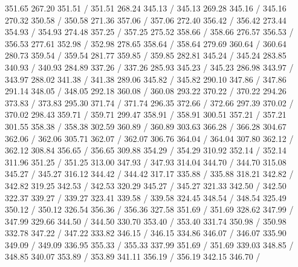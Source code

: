 { 351.65 267.20 351.51 /
 351.51 268.24 345.13 /
 345.13 269.28 345.16 /
 345.16 270.32 350.58 /
 350.58 271.36 357.06 /
 357.06 272.40 356.42 /
 356.42 273.44 354.93 /
 354.93 274.48 357.25 /
 357.25 275.52 358.66 /
 358.66 276.57 356.53 /
 356.53 277.61 352.98 /
 352.98 278.65 358.64 /
 358.64 279.69 360.64 /
 360.64 280.73 359.54 /
 359.54 281.77 359.85 /
 359.85 282.81 345.24 /
 345.24 283.85 340.93 /
 340.93 284.89 337.26 /
 337.26 285.93 345.23 /
 345.23 286.98 343.97 /
 343.97 288.02 341.38 /
 341.38 289.06 345.82 /
 345.82 290.10 347.86 /
 347.86 291.14 348.05 /
 348.05 292.18 360.08 /
 360.08 293.22 370.22 /
 370.22 294.26 373.83 /
 373.83 295.30 371.74 /
 371.74 296.35 372.66 /
 372.66 297.39 370.02 /
 370.02 298.43 359.71 /
 359.71 299.47 358.91 /
 358.91 300.51 357.21 /
 357.21 301.55 358.38 /
 358.38 302.59 360.89 /
 360.89 303.63 366.28 /
 366.28 304.67 362.06 /
 362.06 305.71 362.07 /
 362.07 306.76 364.04 /
 364.04 307.80 362.12 /
 362.12 308.84 356.65 /
 356.65 309.88 354.29 /
 354.29 310.92 352.14 /
 352.14 311.96 351.25 /
 351.25 313.00 347.93 /
 347.93 314.04 344.70 /
 344.70 315.08 345.27 /
 345.27 316.12 344.42 /
 344.42 317.17 335.88 /
 335.88 318.21 342.82 /
 342.82 319.25 342.53 /
 342.53 320.29 345.27 /
 345.27 321.33 342.50 /
 342.50 322.37 339.27 /
 339.27 323.41 339.58 /
 339.58 324.45 348.54 /
 348.54 325.49 350.12 /
 350.12 326.54 356.36 /
 356.36 327.58 351.69 /
 351.69 328.62 347.99 /
 347.99 329.66 344.50 /
 344.50 330.70 353.40 /
 353.40 331.74 350.98 /
 350.98 332.78 347.22 /
 347.22 333.82 346.15 /
 346.15 334.86 346.07 /
 346.07 335.90 349.09 /
 349.09 336.95 355.33 /
 355.33 337.99 351.69 /
 351.69 339.03 348.85 /
 348.85 340.07 353.89 /
 353.89 341.11 356.19 /
 356.19 342.15 346.70 /
}
